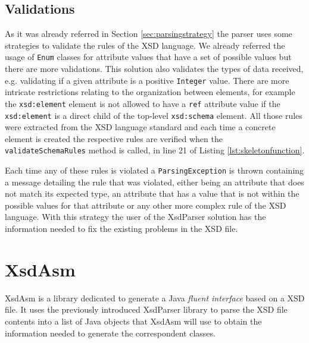 \subsection{Validations}

As it was already referred in Section \ref{sec:parsingstrategy} the parser uses some strategies to validate the rules of the \ac{XSD} language. We already referred the usage of \texttt{Enum} classes for attribute values that have a set of possible values but there are more validations. This solution also validates the types of data received, e.g. validating if a given attribute is a positive \texttt{Integer} value. There are more intricate restrictions relating to the organization between elements, for example the \texttt{xsd:element} element is not allowed to have a \texttt{ref} attribute value if the \texttt{xsd:element} is a direct child of the top-level \texttt{xsd:schema} element. All those rules were extracted from the \ac{XSD} language standard and each time a concrete element is created the respective rules are verified when the \texttt{validateSchemaRules} method is called, in line 21 of Listing \ref{lst:skeletonfunction}. 

\noindent
Each time any of these rules is violated a \texttt{ParsingException} is thrown containing a message detailing the rule that was violated, either being an attribute that does not match its expected type, an attribute that has a value that is not within the possible values for that attribute or any other more complex rule of the \ac{XSD} language. With this strategy the user of the XsdParser solution has the information needed to fix the existing problems in the \ac{XSD} file.

\section{XsdAsm} %
\label{sec:xsdasm}

XsdAsm is a library dedicated to generate a Java \textit{fluent interface} based on a \ac{XSD} file. It uses the previously introduced XsdParser library to parse the \ac{XSD} file contents into a list of Java objects that XsdAsm will use to obtain the information needed to generate the correspondent classes. 

